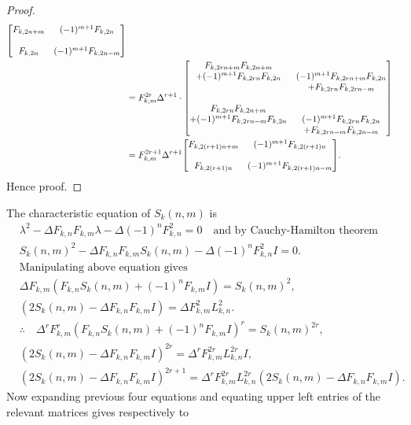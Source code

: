 \begin{proof}
\begin{align*}
{          \begin{bmatrix}
            F_{k,2n+m} & (-1)^{m+1}F_{k,2n}\bigskip \\
            F_{k,2n} & (-1)^{m+1}F_{k,2n-m} 
          \end{bmatrix}
        }\\&= F_{k,m}^{2r}\Delta^{r+1}
				\cdot{
          \begin{bmatrix}
            F_{k,2rn+m}F_{k,2n+m}\\+(-1)^{m+1}F_{k,2rn}F_{k,2n} & (-1)^{m+1}F_{k,2rn+m}F_{k,2n}\\&+F_{k,2rn}F_{k,2rn-m}\bigskip \\
						F_{k,2rn}F_{k,2n+m}\\+(-1)^{m+1}F_{k,2rn-m}F_{k,2n} & (-1)^{m+1}F_{k,2rn}F_{k,2n}\\&+F_{k,2rn-m}F_{k,2n-m} 
					 \end{bmatrix}
						}\\
&=F_{k,m}^{2r+1}\Delta^{r+1}{
          \begin{bmatrix}
            F_{k,2(r+1)n+m} & (-1)^{m+1}F_{k,2(r+1)n}\bigskip \\
            F_{k,2(r+1)n} & (-1)^{m+1}F_{k,2(r+1)n-m} 
          \end{bmatrix}
        }.
        \end{align*}
Hence proof.
\end{proof}
\noindent The characteristic equation of $S_{k}(n,m)$ is
	\begin{align*}
	&\lambda^2-\Delta F_{k,n}F_{k,m}\lambda-\Delta (-1)^nF_{k,n}^2=0\quad\text{and by Cauchy-Hamilton theorem}\\
		&S_{k}(n,m)^2-\Delta F_{k,n}F_{k,m}S_{k}(n,m)-\Delta (-1)^nF_{k,n}^2I=0.\\
&\text{Manipulating above equation gives}\\
		&\Delta F_{k,m}(F_{k,n}S_{k}(n,m)+ (-1)^nF_{k,m}I)=S_{k}(n,m)^2,\\
		&	(2S_{k}(n,m)-\Delta F_{k,n}F_{k,m}I)=\Delta F_{k,m}^2L_{k,n}^2.\\
	&\therefore\quad	\Delta^rF_{k,m}^r(F_{k,n}S_{k}(n,m)+(-1)^nF_{k,m}I)^r=S_{k}(n,m)^{2r},\\
	&(2S_{k}(n,m)-\Delta F_{k,n}F_{k,m}I)^{2r}=\Delta^r F_{k,m}^{2r}L_{k,n}^{2r}I,\\	
&(2S_{k}(n,m)-\Delta F_{k,n}F_{k,m}I)^{2r+1}=\Delta^r F_{k,m}^{2r}L_{k,n}^{2r}(2S_{k}(n,m)-\Delta F_{k,n}F_{k,m}I).
\end{align*}
Now expanding previous four equations and equating upper left entries of the relevant matrices gives respectively to
